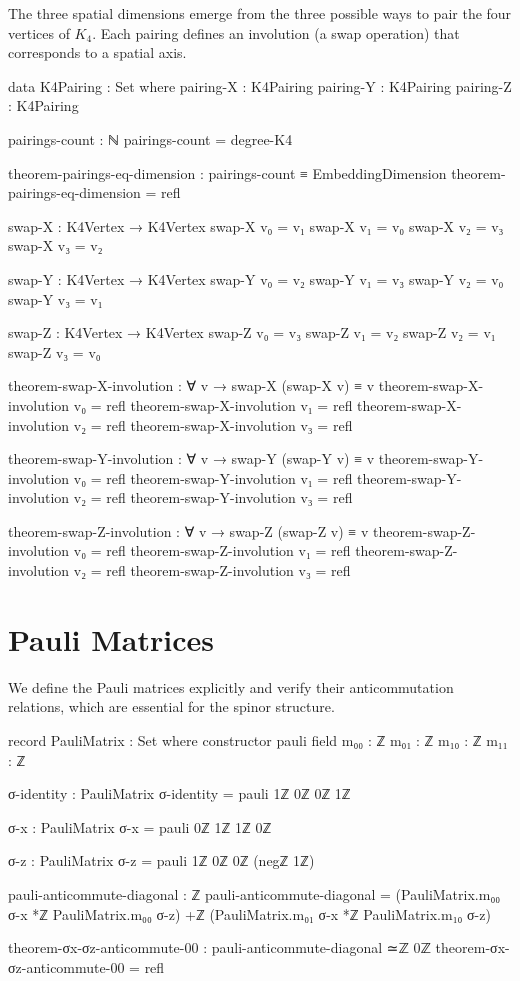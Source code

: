 \documentclass[11pt,a4paper]{book}
\begin{document}
The three spatial dimensions emerge from the three possible ways to pair the four vertices of $K_4$. Each pairing defines an involution (a swap operation) that corresponds to a spatial axis.

\begin{code}
data K4Pairing : Set where
  pairing-X : K4Pairing
  pairing-Y : K4Pairing
  pairing-Z : K4Pairing

pairings-count : ℕ
pairings-count = degree-K4

theorem-pairings-eq-dimension : pairings-count ≡ EmbeddingDimension
theorem-pairings-eq-dimension = refl

swap-X : K4Vertex → K4Vertex
swap-X v₀ = v₁
swap-X v₁ = v₀
swap-X v₂ = v₃
swap-X v₃ = v₂

swap-Y : K4Vertex → K4Vertex
swap-Y v₀ = v₂
swap-Y v₁ = v₃
swap-Y v₂ = v₀
swap-Y v₃ = v₁

swap-Z : K4Vertex → K4Vertex
swap-Z v₀ = v₃
swap-Z v₁ = v₂
swap-Z v₂ = v₁
swap-Z v₃ = v₀

theorem-swap-X-involution : ∀ v → swap-X (swap-X v) ≡ v
theorem-swap-X-involution v₀ = refl
theorem-swap-X-involution v₁ = refl
theorem-swap-X-involution v₂ = refl
theorem-swap-X-involution v₃ = refl

theorem-swap-Y-involution : ∀ v → swap-Y (swap-Y v) ≡ v
theorem-swap-Y-involution v₀ = refl
theorem-swap-Y-involution v₁ = refl
theorem-swap-Y-involution v₂ = refl
theorem-swap-Y-involution v₃ = refl

theorem-swap-Z-involution : ∀ v → swap-Z (swap-Z v) ≡ v
theorem-swap-Z-involution v₀ = refl
theorem-swap-Z-involution v₁ = refl
theorem-swap-Z-involution v₂ = refl
theorem-swap-Z-involution v₃ = refl
\end{code}

\section{Pauli Matrices}

We define the Pauli matrices explicitly and verify their anticommutation relations, which are essential for the spinor structure.

\begin{code}
record PauliMatrix : Set where
  constructor pauli
  field
    m₀₀ : ℤ
    m₀₁ : ℤ
    m₁₀ : ℤ
    m₁₁ : ℤ

σ-identity : PauliMatrix
σ-identity = pauli 1ℤ 0ℤ 0ℤ 1ℤ

σ-x : PauliMatrix
σ-x = pauli 0ℤ 1ℤ 1ℤ 0ℤ

σ-z : PauliMatrix
σ-z = pauli 1ℤ 0ℤ 0ℤ (negℤ 1ℤ)

pauli-anticommute-diagonal : ℤ
pauli-anticommute-diagonal = 
  (PauliMatrix.m₀₀ σ-x *ℤ PauliMatrix.m₀₀ σ-z) +ℤ 
  (PauliMatrix.m₀₁ σ-x *ℤ PauliMatrix.m₁₀ σ-z)

theorem-σx-σz-anticommute-00 : pauli-anticommute-diagonal ≃ℤ 0ℤ
theorem-σx-σz-anticommute-00 = refl
\end{code}
\end{document}
